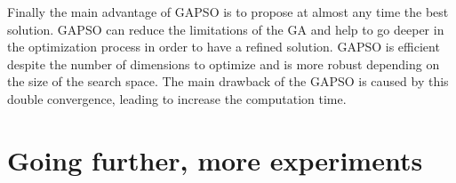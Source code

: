 Finally the main advantage of GAPSO is to propose at almost any time the best solution.%
GAPSO can reduce the limitations of the GA and help to go deeper in the optimization process in order to have a refined solution. %
 GAPSO is efficient despite the number of dimensions to optimize and is more robust depending on the size of the search space.
The main drawback of the GAPSO is caused by this double convergence, leading to increase the computation time.
 
   
		
\section{Going further, more experiments }\label{sec:GoingFurtherWaypointPose}

